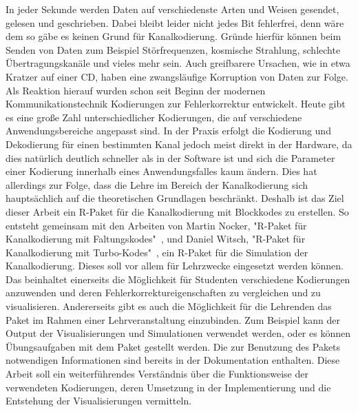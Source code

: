 In jeder Sekunde werden Daten auf verschiedenste Arten und Weisen gesendet, gelesen und geschrieben. Dabei bleibt leider nicht jedes Bit fehlerfrei, denn wäre dem so gäbe es keinen Grund für Kanalkodierung. Gründe hierfür können beim Senden von Daten zum Beispiel Störfrequenzen, kosmische Strahlung, schlechte Übertragungskanäle und vieles mehr sein. Auch greifbarere Ursachen, wie in etwa Kratzer auf einer CD, haben eine zwangsläufige Korruption von Daten zur Folge. Als Reaktion hierauf wurden schon seit Beginn der modernen Kommunikationstechnik Kodierungen zur Fehlerkorrektur entwickelt. Heute gibt es eine große Zahl unterschiedlicher Kodierungen, die auf verschiedene Anwendungsbereiche angepasst sind. In der Praxis erfolgt die Kodierung und Dekodierung für einen bestimmten Kanal jedoch meist direkt in der Hardware, da dies natürlich deutlich schneller als in der Software ist und sich die Parameter einer Kodierung innerhalb eines Anwendungsfalles kaum ändern. Dies hat allerdings zur Folge, dass die Lehre im Bereich der Kanalkodierung sich hauptsächlich auf die theoretischen Grundlagen beschränkt. Deshalb ist das Ziel dieser Arbeit ein R-Paket für die Kanalkodierung mit Blockkodes zu erstellen. So entsteht gemeinsam mit den Arbeiten von Martin Nocker, "R-Paket für Kanalkodierung mit Faltungskodes"~\cite{nocker}, und Daniel Witsch, "R-Paket für Kanalkodierung mit Turbo-Kodes"~\cite{witsch}, ein R-Paket für die Simulation der Kanalkodierung. Dieses soll vor allem für Lehrzwecke eingesetzt werden können. Das beinhaltet einerseits die Möglichkeit für Studenten verschiedene Kodierungen anzuwenden und deren Fehlerkorrektureigenschaften zu vergleichen und zu visualisieren. Andererseits gibt es auch die Möglichkeit für die Lehrenden das Paket im Rahmen einer Lehrveranstaltung einzubinden. Zum Beispiel kann der Output der Visualisierungen und Simulationen verwendet werden, oder es können Übungsaufgaben mit dem Paket gestellt werden. Die zur Benutzung des Pakets notwendigen Informationen sind bereits in der Dokumentation enthalten. Diese Arbeit soll ein weiterführendes Verständnis über die Funktionsweise der verwendeten Kodierungen, deren Umsetzung in der Implementierung und die Entstehung der Visualisierungen vermitteln. 